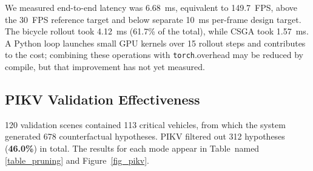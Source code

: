 \documentclass[preprint,12pt]{elsarticle}
\begin{document}
We measured end-to-end latency was 6.68~ms, equivalent to 149.7~FPS,  above the 30~FPS reference target and below separate 10~ms per-frame design target. The bicycle rollout took 4.12~ms (61.7\% of the total), while CSGA took 1.57~ms. A Python loop launches small GPU kernels over 15 rollout steps and contributes to the cost;  combining these operations with \texttt{torch}.overhead may be reduced by compile, but that improvement has not yet measured.

\subsection{PIKV Validation Effectiveness}
120 validation scenes contained 113 critical vehicles, from which the system generated 678 counterfactual hypotheses. PIKV filtered out 312 hypotheses (\textbf{46.0\%}) in total. The results for each mode appear in Table~named \ref{table_pruning} and Figure~\ref{fig_pikv}.

\begin{table}[H]
\caption{PIKV hypothesis pruning across the six counterfactual modes (678 hypotheses, 113 per mode, from real traffic validation samples).}
\label{table_pruning}
\centering
{}
\end{table}
\end{document}
